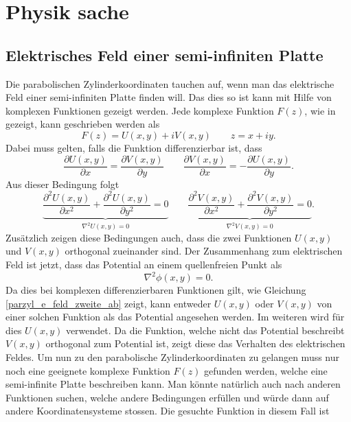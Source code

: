 %
%
%
\section{Physik sache 
\label{parzyl:section:teil2}}


\subsection{Elektrisches Feld einer semi-infiniten Platte
\label{parzyl:subsection:bonorum}}
Die parabolischen Zylinderkoordinaten tauchen auf, wenn man das elektrische Feld einer semi-infiniten Platte finden will. Das dies so ist kann mit Hilfe von komplexen Funktionen gezeigt werden. Jede komplexe Funktion $F(z)$, wie in  gezeigt, kann geschrieben werden als
\begin{equation}
	F(z) = U(x,y) + iV(x,y) \qquad z = x + iy.
\end{equation}  
Dabei muss gelten, falls die Funktion differenzierbar ist, dass
\begin{equation}
	\frac{\partial U(x,y)}{\partial x} 
	=
	\frac{\partial V(x,y)}{\partial y} 
	\qquad
	\frac{\partial V(x,y)}{\partial x}
	=
	-\frac{\partial U(x,y)}{\partial y}.
\end{equation}
Aus dieser Bedingung folgt 
\begin{equation}
	\label{parzyl_e_feld_zweite_ab}
	\underbrace{
	\frac{\partial^2 U(x,y)}{\partial x^2}
	+ 
	\frac{\partial^2 U(x,y)}{\partial y^2}
	=
	0
	}_{\nabla^2U(x,y)=0}
	\qquad
	\underbrace{
	\frac{\partial^2 V(x,y)}{\partial x^2}
	+
	\frac{\partial^2 V(x,y)}{\partial y^2}
	=
	0
	}_{\nabla^2V(x,y) = 0}.
\end{equation}
Zusätzlich zeigen diese Bedingungen auch, dass die zwei Funktionen $U(x,y)$ und $V(x,y)$ orthogonal zueinander sind.
Der Zusammenhang zum elektrischen Feld ist jetzt, dass das Potential an einem quellenfreien Punkt als 
\begin{equation}
	\nabla^2\phi(x,y) = 0.
\end{equation}
Da dies bei komplexen differenzierbaren Funktionen gilt, wie Gleichung \ref{parzyl_e_feld_zweite_ab} zeigt, kann entweder $U(x,y)$ oder $V(x,y)$ von einer solchen Funktion als das Potential angesehen werden. Im weiteren wird für dies $U(x,y)$ verwendet.  
Da die Funktion, welche nicht das Potential beschreibt $V(x,y)$ orthogonal zum Potential ist, zeigt diese das Verhalten des elektrischen Feldes.
Um nun zu den parabolische Zylinderkoordinaten zu gelangen muss nur noch eine geeignete komplexe Funktion $F(z)$ gefunden werden, welche eine semi-infinite Platte beschreiben kann. Man könnte natürlich auch nach anderen Funktionen suchen, welche andere Bedingungen erfüllen und würde dann auf andere Koordinatensysteme stossen. Die gesuchte Funktion in diesem Fall ist

